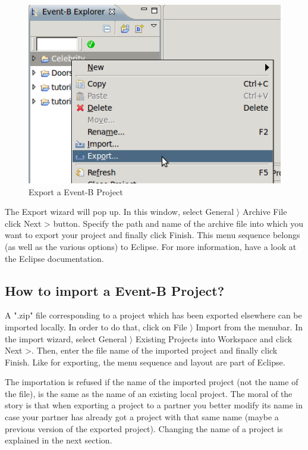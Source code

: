 \begin{figure}[!h]
\begin{center}
	\includegraphics{img/faq/faq_exportproject.png}
	\caption{Export a Event-B Project}
	\label{fig_faq_exportproject}
\end{center}
\end{figure}

The Export wizard will pop up. In this window, select \textsf{General $\rangle$ Archive File} click \textsf{Next >} button. Specify the path and name of the archive file into which you want to export your project and finally click \textsf{Finish}. This menu sequence belongs (as well as the various options) to Eclipse. For more information, have a look at the Eclipse documentation. 

\subsection{How to import a Event-B Project?}


A ".zip" file corresponding to a project which has been exported elsewhere can be imported locally. In order to do that, click on \textsf{File $\rangle$ Import} from the menubar. In the import wizard, select \textsf{General $\rangle$ Existing Projects into Workspace} and click \textsf{Next >}. Then, enter the file name of the imported project and finally click Finish. Like for exporting, the menu sequence and layout are part of Eclipse.

The importation is refused if the name of the imported project (not the name of the file), is the same as the name of an existing local project. The moral of the story is that when exporting a project to a partner you better modify its name in case your partner has already got a project with that same name (maybe a previous version of the exported project). Changing the name of a project is explained in the next section. 

